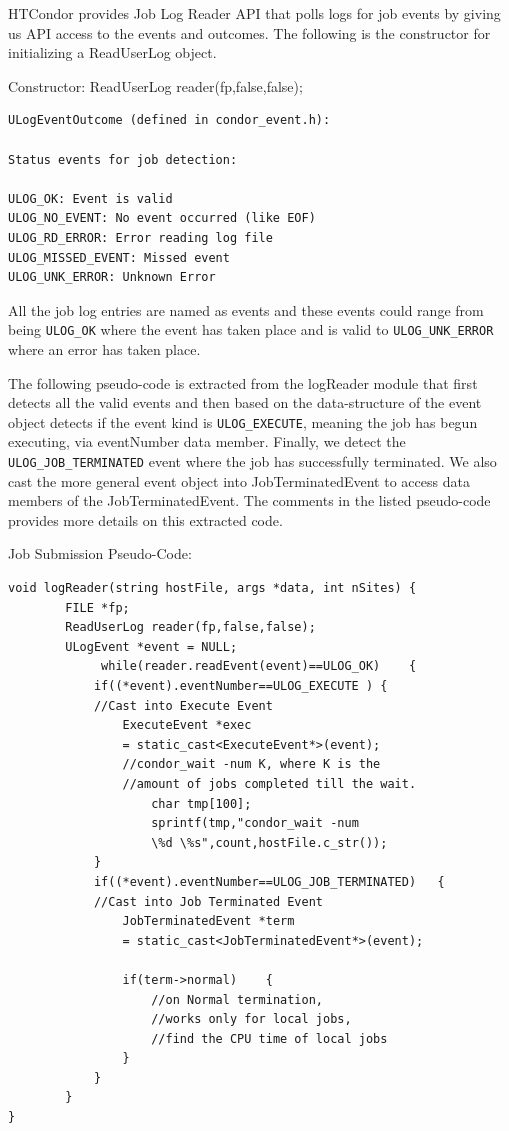 \documentclass[ms,electronic,double]{nuthesis}
\begin{document}
HTCondor provides Job Log Reader API \cite{manual56} that polls logs for job events by giving us 
API access to the events and outcomes. The following is the constructor for 
initializing a ReadUserLog object.

Constructor:
ReadUserLog reader(fp,false,false);
\begin{verbatim}
ULogEventOutcome (defined in condor_event.h):

Status events for job detection:

ULOG_OK: Event is valid
ULOG_NO_EVENT: No event occurred (like EOF)
ULOG_RD_ERROR: Error reading log file
ULOG_MISSED_EVENT: Missed event
ULOG_UNK_ERROR: Unknown Error
\end{verbatim}

All the job log entries are named as events and these events could range from being  \texttt{ULOG\_OK} where 
the event has taken place and is valid to \texttt{ULOG\_UNK\_ERROR} where an error has 
taken place.

The following pseudo-code is extracted from the logReader module that first 
detects all the valid events and then based on the data-structure of the event 
object detects if the event kind is \texttt{ULOG\_EXECUTE}, meaning the job has begun 
executing, via eventNumber data member. Finally, we detect the \texttt{ULOG\_JOB\_TERMINATED} 
event where the job has successfully terminated. We also cast the more general event 
object into JobTerminatedEvent to access data members of the 
JobTerminatedEvent. The comments in the listed pseudo-code provides more details 
on this extracted code.


Job Submission Pseudo-Code:

\begin{lstlisting}
void logReader(string hostFile, args *data, int nSites)	{		
		FILE *fp;
		ReadUserLog reader(fp,false,false);
		ULogEvent *event = NULL;		
             while(reader.readEvent(event)==ULOG_OK)	{                    
            if((*event).eventNumber==ULOG_EXECUTE )	{                                
            //Cast into Execute Event
                ExecuteEvent *exec 
                = static_cast<ExecuteEvent*>(event);                                       
                //condor_wait -num K, where K is the 
                //amount of jobs completed till the wait.
                    char tmp[100];
                    sprintf(tmp,"condor_wait -num 
                    \%d \%s",count,hostFile.c_str());
            }            
            if((*event).eventNumber==ULOG_JOB_TERMINATED)	{                
            //Cast into Job Terminated Event
                JobTerminatedEvent *term 
                = static_cast<JobTerminatedEvent*>(event);                
                
                if(term->normal)	{                    
                    //on Normal termination, 
                    //works only for local jobs, 
                    //find the CPU time of local jobs
                }               
            }
        }
}

\end{lstlisting}
\end{document}
